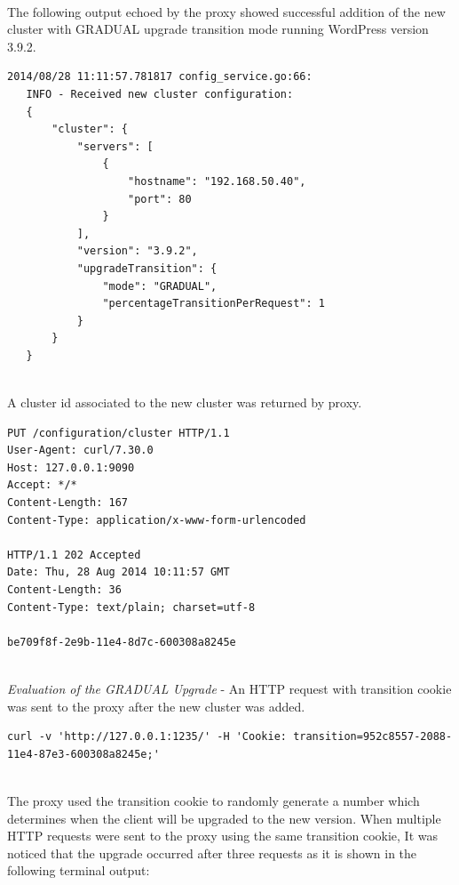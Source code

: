 \documentclass[a4paper,11pt,twoside]{report}
\begin{document}
\noindent \\
The following output echoed by the proxy showed successful addition of the new cluster with GRADUAL upgrade transition mode running WordPress version 3.9.2. \smallskip

\begin{lstlisting}[language=terminal]
2014/08/28 11:11:57.781817 config_service.go:66:     
   INFO - Received new cluster configuration:
   {
       "cluster": {
           "servers": [
               {
                   "hostname": "192.168.50.40", 
                   "port": 80
               }
           ], 
           "version": "3.9.2", 
           "upgradeTransition": {
               "mode": "GRADUAL", 
               "percentageTransitionPerRequest": 1
           }
       }
   }
\end{lstlisting}

\noindent\\ 
A cluster id associated to the new cluster was returned by proxy.\smallskip

\begin{lstlisting}[language=terminal]
PUT /configuration/cluster HTTP/1.1
User-Agent: curl/7.30.0
Host: 127.0.0.1:9090
Accept: */*
Content-Length: 167
Content-Type: application/x-www-form-urlencoded
 
HTTP/1.1 202 Accepted
Date: Thu, 28 Aug 2014 10:11:57 GMT
Content-Length: 36
Content-Type: text/plain; charset=utf-8
 
be709f8f-2e9b-11e4-8d7c-600308a8245e
\end{lstlisting}

\noindent\\
\textit{Evaluation of the GRADUAL Upgrade} - An HTTP request with transition cookie was sent to the proxy after the new cluster was added.\smallskip

\begin{lstlisting}[language=terminal]
curl -v 'http://127.0.0.1:1235/' -H 'Cookie: transition=952c8557-2088-11e4-87e3-600308a8245e;'
\end{lstlisting}

\noindent\\
The proxy used the transition cookie to randomly generate a number which determines when the client will be upgraded to the new version. When multiple HTTP requests were sent to the proxy using the same transition cookie, It was noticed that the upgrade occurred after three requests as it is shown in the following terminal output: \smallskip
\end{document}
